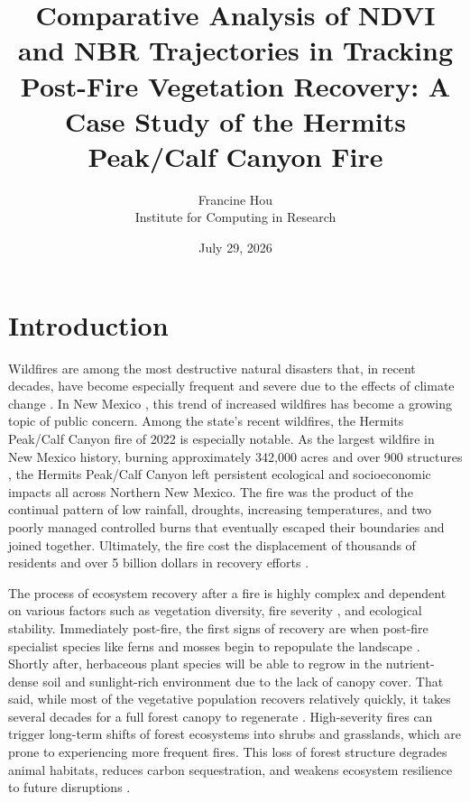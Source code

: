 \documentclass[11pt]{article}
\title{Comparative Analysis of NDVI and NBR Trajectories in Tracking Post-Fire Vegetation Recovery: A Case Study of the Hermits Peak/Calf Canyon Fire}
\author{Francine Hou \\ Institute for Computing in Research}
\date{July 29, 2026}
\begin{document}
\maketitle

\section{Introduction}

Wildfires are among the most destructive natural disasters that, in recent decades, have become especially frequent and severe due to the effects of climate change \cite{climateChange}. In New Mexico \cite{nmDrought}, this trend of increased wildfires has become a growing topic of public concern. Among the state's recent wildfires, the Hermits Peak/Calf Canyon fire of 2022 is especially notable. As the largest wildfire in New Mexico history, burning approximately 342,000 acres and over 900 structures \cite{nrcsHermits}, the Hermits Peak/Calf Canyon left persistent ecological and socioeconomic impacts all across Northern New Mexico. The fire was the product of the continual pattern of low rainfall, droughts, increasing temperatures, and two poorly managed controlled burns that eventually escaped their boundaries and joined together. Ultimately, the fire cost the displacement of thousands of residents and over 5 billion dollars in recovery efforts \cite{ebscoRecovery}.

The process of ecosystem recovery after a fire is highly complex and dependent on various factors such as vegetation diversity, fire severity \cite{nasaRecover}, and ecological stability. Immediately post-fire, the first signs of recovery are when post-fire specialist species like ferns and mosses begin to repopulate the landscape \cite{nasaRecover}. Shortly after, herbaceous plant species will be able to regrow in the nutrient-dense soil and sunlight-rich environment due to the lack of canopy cover. That said, while most of the vegetative population recovers relatively quickly, it takes several decades for a full forest canopy to regenerate \cite{nasaRecover}. High-severity fires can trigger long-term shifts of forest ecosystems into shrubs and grasslands, which are prone to experiencing more frequent fires. This loss of forest structure degrades animal habitats, reduces carbon sequestration, and weakens ecosystem resilience to future disruptions \cite{treeRegen}.
\end{document}
